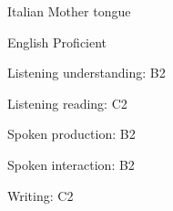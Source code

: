 

\begin{cventries}

  \cventry
    {Italian} %
    {Mother tongue} %
    { } %
    { } %
    { } %
    

  \cventry
    {English} %
    {Proficient} %
    { } %
    { } %
    {
    	  \begin{cvitems} %
      \item {Listening understanding: B2}
      \item {Listening reading: C2}
	  \item {Spoken production: B2}
	  \item {Spoken interaction: B2}	
	  \item {Writing: C2}
      \end{cvitems}
    }
  

\end{cventries}
